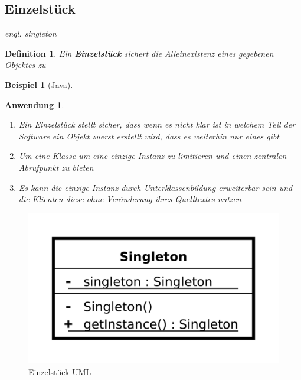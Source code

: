 \documentclass[a4paper]{article}
\theoremstyle{break}
\newtheorem{defi}{Definition}[section]
\newtheorem{ex}{Beispiel}[section]
\newtheorem{why}{Anwendung}[section]
\begin{document}
\subsection{Einzelstück}
\textit{engl. singleton}
\begin{defi}
	Ein \textbf{Einzelstück} sichert die Alleinexistenz eines gegebenen Objektes zu
\end{defi}
\begin{ex}[Java]
		
\end{ex}
\begin{why}
	\begin{enumerate}
		\item Ein Einzelstück stellt sicher, dass wenn es nicht klar ist in welchem Teil der Software ein Objekt zuerst erstellt wird, dass es weiterhin nur eines gibt
		\item Um eine Klasse um eine einzige Instanz zu limitieren und einen zentralen Abrufpunkt zu bieten
		\item Es kann die einzige Instanz durch Unterklassenbildung
		erweiterbar sein und die Klienten diese ohne Veränderung
		ihres Quelltextes nutzen
	\end{enumerate}
\end{why}
\begin{figure}[H]
	\centering
	\includegraphics[width=\textwidth]{../diagrams/uml/SingletonPattern.png}
	\caption{Einzelstück UML}
\end{figure}


\newpage
\end{document}
